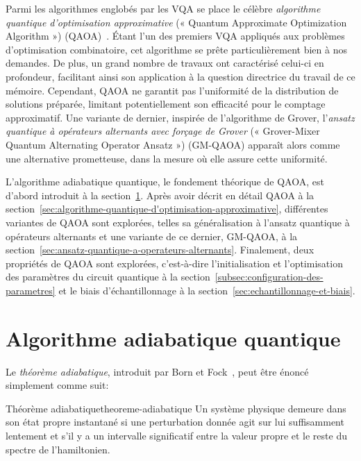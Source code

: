 Parmi les algorithmes englobés par les VQA se place le célèbre \textit{algorithme quantique d'optimisation approximative} (« Quantum Approximate Optimization Algorithm ») (QAOA)~\cite{farhiQuantumApproximateOptimization2014}. Étant l'un des premiers VQA appliqués aux problèmes d'optimisation combinatoire, cet algorithme se prête particulièrement bien à nos demandes. De plus, un grand nombre de travaux ont caractérisé celui-ci en profondeur, facilitant ainsi son application à la question directrice du travail de ce mémoire. Cependant, QAOA ne garantit pas l'uniformité de la distribution de solutions préparée, limitant potentiellement son efficacité pour le comptage approximatif. Une variante de dernier, inspirée de l'algorithme de Grover, l'\textit{ansatz quantique à opérateurs alternants avec forçage de Grover} (« Grover-Mixer Quantum Alternating Operator Ansatz ») (GM-QAOA) apparaît alors comme une alternative prometteuse, dans la mesure où elle assure cette uniformité.

L'algorithme adiabatique quantique, le fondement théorique de QAOA, est d'abord introduit à la section~\ref{sec:algorithme-adiabatique-quantique}. Après avoir décrit en détail QAOA à la section~\ref{sec:algorithme-quantique-d'optimisation-approximative}, différentes variantes de QAOA sont explorées, telles sa généralisation à l'ansatz quantique à opérateurs alternants et une variante de ce dernier, GM-QAOA, à la section~\ref{sec:ansatz-quantique-a-operateurs-alternants}. Finalement, deux propriétés de QAOA sont explorées, c'est-à-dire l'initialisation et l'optimisation des paramètres du circuit quantique à la section~\ref{subsec:configuration-des-parametres} et le biais d'échantillonnage à la section~\ref{sec:echantillonnage-et-biais}.


\section{Algorithme adiabatique quantique}
\label{sec:algorithme-adiabatique-quantique}

Le \textit{théorème adiabatique}, introduit par Born et Fock~\cite{bornBeweisAdiabatensatzes1928}, peut être énoncé simplement comme suit:

\begin{subtheorem}{Théorème adiabatique}{theoreme-adiabatique}
    Un système physique demeure dans son état propre instantané si une perturbation donnée agit sur lui suffisamment lentement et s'il y a un intervalle significatif entre la valeur propre et le reste du spectre de l'hamiltonien.
\end{subtheorem}

